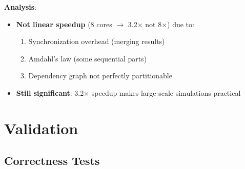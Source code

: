 \textbf{Analysis}:

\begin{itemize}
    \item \textbf{Not linear speedup} (8 cores $\to$ 3.2$\times$ not 8$\times$) due to:
    \begin{enumerate}
        \item Synchronization overhead (merging results)
        \item Amdahl's law (some sequential parts)
        \item Dependency graph not perfectly partitionable
    \end{enumerate}
    
    \item \textbf{Still significant}: 3.2$\times$ speedup makes large-scale simulations practical
\end{itemize}

\section{Validation}
\label{sec:simulation-validation}

\subsection{Correctness Tests}
\label{subsec:correctness-tests}

